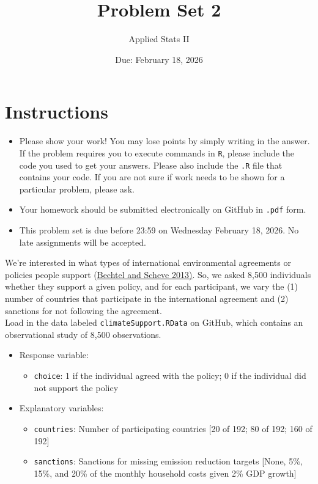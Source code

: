 \documentclass[12pt,letterpaper]{article}
\title{Problem Set 2}
\date{Due: February 18, 2026}
\author{Applied Stats II}
\begin{document}
	\maketitle
	\section*{Instructions}
	\begin{itemize}
		\item Please show your work! You may lose points by simply writing in the answer. If the problem requires you to execute commands in \texttt{R}, please include the code you used to get your answers. Please also include the \texttt{.R} file that contains your code. If you are not sure if work needs to be shown for a particular problem, please ask.
		\item Your homework should be submitted electronically on GitHub in \texttt{.pdf} form.
		\item This problem set is due before 23:59 on Wednesday February 18, 2026. No late assignments will be accepted.

	\end{itemize}

	\vspace{.25cm}

\noindent We're interested in what types of international environmental agreements or policies people support (\href{https://www.pnas.org/content/110/34/13763}{Bechtel and Scheve 2013)}. So, we asked 8,500 individuals whether they support a given policy, and for each participant, we vary the (1) number of countries that participate in the international agreement and (2) sanctions for not following the agreement. \\

\noindent Load in the data labeled \texttt{climateSupport.RData} on GitHub, which contains an observational study of 8,500 observations.

\begin{itemize}
	\item
	Response variable: 
	\begin{itemize}
		\item \texttt{choice}: 1 if the individual agreed with the policy; 0 if the individual did not support the policy
	\end{itemize}
	\item
	Explanatory variables: 
	\begin{itemize}
		\item
		\texttt{countries}: Number of participating countries [20 of 192; 80 of 192; 160 of 192]
		\item
		\texttt{sanctions}: Sanctions for missing emission reduction targets [None, 5\%, 15\%, and 20\% of the monthly household costs given 2\% GDP growth]
		
	\end{itemize}
	
\end{itemize}
\end{document}
